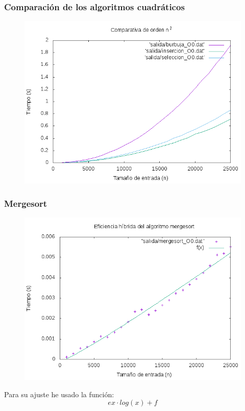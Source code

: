\documentclass[spanish]{beamer}
\begin{document}
\begin{frame}\frametitle{Comparación de los algoritmos cuadráticos}
  \begin{figure}[H]
    \centering   
        \includegraphics[clip,width=1\columnwidth]{../plots/cuadraticos_O0.png}%
    \end{figure}
  \end{frame}

 \begin{frame}\frametitle{Mergesort}
    \begin{figure}[H]
    \centering   
    \includegraphics[clip,width=0.6\columnwidth]{../plots/mergesort_O0_fit.png}%
    \end{figure}

    Para su ajuste he usado la función: $$ex\cdot log(x)+f$$
       
  \end{frame}
\end{document}
